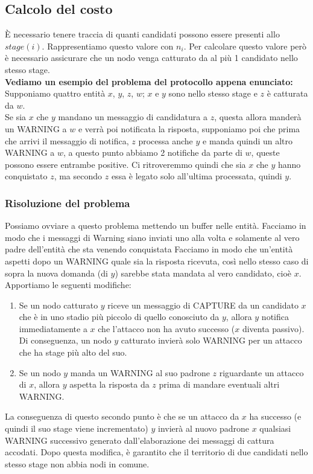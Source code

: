 \subsection{Calcolo del costo}
È necessario tenere traccia di quanti candidati possono essere presenti allo
$stage(i)$. Rappresentiamo questo valore con $n_i$. Per calcolare questo valore
però è necessario assicurare che un nodo venga catturato da al più 1 candidato
nello stesso stage.\\
\textbf{Vediamo un esempio del problema del protocollo appena enunciato:}\\
Supponiamo quattro entità $x$, $y$, $z$, $w$; $x$ e $y$ sono nello stesso stage
e $z$ è catturata da $w$.\\
Se sia $x$ che $y$ mandano un messaggio di candidatura a $z$, questa allora
manderà un WARNING a $w$ e verrà poi notificata la risposta, supponiamo poi che
prima che arrivi il messaggio di notifica, $z$ processa anche $y$ e manda quindi un
altro WARNING a $w$, a questo punto abbiamo 2 notifiche da parte di $w$, queste
possono essere entrambe positive. Ci ritroveremmo quindi che sia $x$ che $y$ hanno
conquistato $z$, ma secondo $z$ essa è legato solo all'ultima processata, quindi
$y$.

\subsubsection{Risoluzione del problema}
Possiamo ovviare a questo problema mettendo un buffer nelle entità. Facciamo in
modo che i messaggi di Warning siano inviati uno alla volta e solamente al vero
padre dell'entità che sta venendo conquistata Facciamo in modo che un'entità aspetti
dopo un WARNING quale sia la risposta ricevuta, così nello stesso caso di sopra
la nuova domanda (di $y$) sarebbe stata mandata al vero candidato, cioè $x$.\\
Apportiamo le seguenti modifiche:
\begin{enumerate}
    \item Se un nodo catturato $y$ riceve un messaggio di CAPTURE da un
          candidato $x$ che è in uno stadio più piccolo di quello conosciuto da
          $y$, allora $y$ notifica immediatamente a $x$ che l'attacco non ha avuto
          successo ($x$ diventa passivo). Di conseguenza, un nodo $y$ catturato
          invierà solo WARNING per un attacco che ha stage più alto del suo.
    \item Se un nodo $y$ manda un WARNING al suo padrone $z$ riguardante un
          attacco di $x$, allora $y$ aspetta la risposta da $z$ prima di mandare
          eventuali altri WARNING.
\end{enumerate}
La conseguenza di questo secondo punto è che se un attacco da $x$ ha successo (e
quindi il suo stage viene incrementato) $y$ invierà al nuovo padrone $x$ qualsiasi
WARNING successivo generato dall'elaborazione dei messaggi di cattura accodati.
Dopo questa modifica, è garantito che il territorio di due candidati nello
stesso stage non abbia nodi in comune.\\

